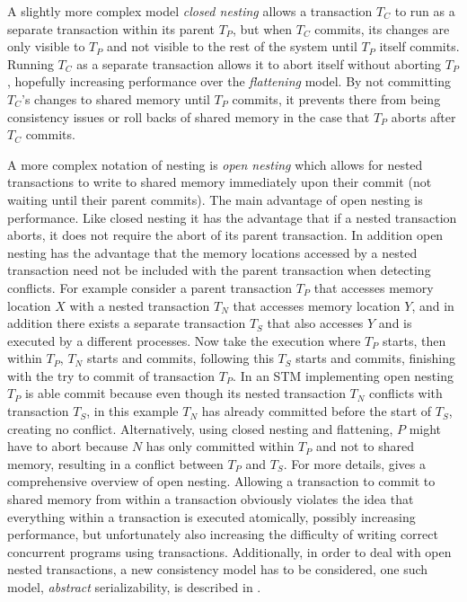 A slightly more complex model \emph{closed nesting} \cite{1133985,Mos81} allows a transaction $T_C$ to run as a separate
 transaction within its parent $T_P$, but when $T_C$ commits, its changes are only visible 
to $T_P$ and not visible to the rest of the system until $T_P$ itself commits.
Running $T_C$ as a separate transaction allows it to abort itself without aborting $T_P$, 
hopefully increasing performance over the \emph{flattening} model.
By not committing $T_C$'s changes to shared memory until $T_P$ commits, it prevents there 
from being consistency issues or roll backs of shared memory in the case that $T_P$ aborts after $T_C$ commits.

A more complex notation of nesting is \emph{open nesting} \cite{Mos06} which allows for nested 
transactions to write to shared memory immediately upon their commit (not waiting until their parent commits).
The main advantage of open nesting is performance.
Like closed nesting it has the 
advantage that if a nested transaction aborts, it does not require the abort of its parent transaction.
In addition open nesting has the advantage that the memory locations accessed
 by a nested transaction need not be included with the parent transaction when detecting conflicts. %
For example consider a parent transaction $T_P$ that accesses memory location $X$ with a 
nested transaction $T_N$ that accesses memory location $Y$, and in addition there exists a separate transaction $T_S$ that also accesses $Y$
and is executed by a different processes.
Now take the execution where $T_P$ starts, then within $T_P$, $T_N$ starts and commits, following this $T_S$ starts 
and commits, finishing with the try to commit of transaction $T_P$.
In an STM implementing open nesting $T_P$ is able commit because even though its nested transaction $T_N$ conflicts with transaction
$T_S$, in this example $T_N$ has already committed before the start of $T_S$, creating no conflict. 
Alternatively, using closed nesting and flattening, $P$ might have to abort because $N$ has only committed
 within $T_P$ and not to shared memory, resulting in a conflict between $T_P$ and $T_S$.
For more details, \cite{Mos06} gives a comprehensive overview of open nesting.
Allowing a transaction to commit to shared memory from within a transaction 
obviously violates the idea that everything within a transaction is executed atomically,
possibly increasing performance, but unfortunately also increasing the difficulty of writing
correct concurrent programs using transactions.
Additionally, in order to deal with open nested transactions, a new consistency model has to be considered, one such model, \emph{abstract} serializability,
is described  in \cite{NMA+07}.

